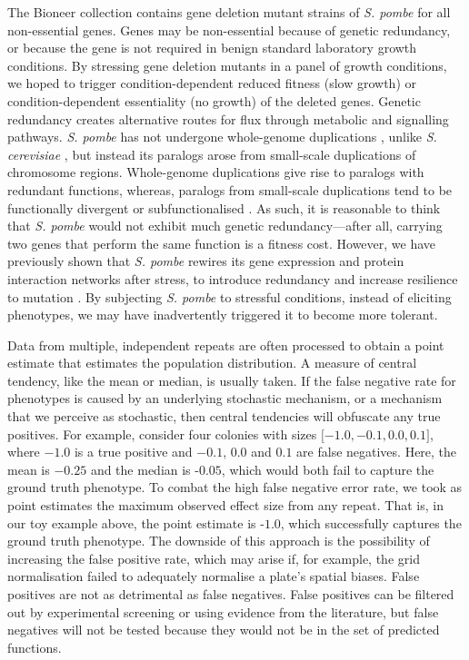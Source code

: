 The Bioneer collection contains gene deletion mutant strains of \emph{S. pombe} for all non-essential genes. Genes may be non-essential because of genetic redundancy, or because the gene is not required in benign standard laboratory growth conditions. By stressing gene deletion mutants in a panel of growth conditions, we hoped to trigger condition-dependent reduced fitness (slow growth) or condition-dependent essentiality (no growth) of the deleted genes. Genetic redundancy creates alternative routes for flux through metabolic and signalling pathways. \emph{S. pombe} has not undergone whole-genome duplications \cite{Vo2016}, unlike \emph{S. cerevisiae} \cite{Kellis2004}, but instead its paralogs arose from small-scale duplications of chromosome regions. Whole-genome duplications give rise to paralogs with redundant functions, whereas, paralogs from small-scale duplications tend to be functionally divergent \cite{Hakes2007} or subfunctionalised \cite{Force1999,Stoltzfus1999}. As such, it is reasonable to think that \emph{S. pombe} would not exhibit much genetic redundancy---after all, carrying two genes that perform the same function is a fitness cost. However, we have previously shown that \emph{S. pombe} rewires its gene expression and protein interaction networks after stress, to introduce redundancy and increase resilience to mutation \cite{Lehtinen2015a,Lehtinen2013}. By subjecting \emph{S. pombe} to stressful conditions, instead of eliciting phenotypes, we may have inadvertently triggered it to become more tolerant.

Data from multiple, independent repeats are often processed to obtain a point estimate that estimates the population distribution. A measure of central tendency, like the mean or median, is usually taken. If the false negative rate for phenotypes is caused by an underlying stochastic mechanism, or a mechanism that we perceive as stochastic, then central tendencies will obfuscate any true positives. For example, consider four colonies with sizes ${[}-1.0, -0.1, 0.0, 0.1{]}$, where $-1.0$ is a true positive and $-0.1$, $0.0$ and $0.1$ are false negatives. Here, the mean is $-0.25$ and the median is -$0.05$, which would both fail to capture the ground truth phenotype. To combat the high false negative error rate, we took as point estimates the maximum observed effect size from any repeat. That is, in our toy example above, the point estimate is -$1.0$, which successfully captures the ground truth phenotype. The downside of this approach is the possibility of increasing the false positive rate, which may arise if, for example, the grid normalisation failed to adequately normalise a plate's spatial biases. False positives are not as detrimental as false negatives. False positives can be filtered out by experimental screening or using evidence from the literature, but false negatives will not be tested because they would not be in the set of predicted functions.

